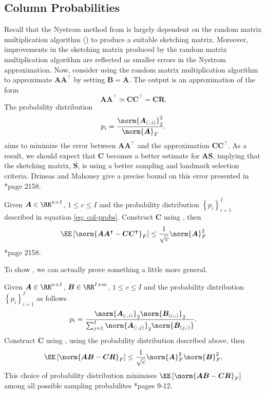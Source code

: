 \subsection{Column Probabilities}\label{Section2.2}

Recall that the Nystrom method from  is largely dependent on the random matrix multiplication algorithm () to produce a suitable sketching matrix. Moreover, improvements in the sketching matrix produced by the random matrix multiplication algorithm are reflected as smaller errors in the Nystrom approximation. Now, consider using the random matrix multiplication algorithm to approximate $\bm{A} \bm{A}^{\intercal}$ by setting $\bm{B} = \bm{A}$. The output is an approximation of the form
\begin{equation*}
    \bm{A} \bm{A}^{\intercal} \simeq \bm{C} \bm{C}^{\intercal} = \bm{C} \bm{R}.
\end{equation*}
The probability distribution
\begin{equation*} \label{eq: col-probs}
    p_i = \frac{\norm{\bm{A}_{(:,i)}}_2^2}{\norm{\bm{A}}_F}.
\end{equation*}
aims to minimize the error between $\bm{A} \bm{A}^{\intercal}$ and the approximation $\bm{C} \bm{C}^{\intercal}$. As a result, we should expect that $\bm{C}$ becomes a better estimate for $\bm{A} \bm{S}$, implying that the sketching matrix, $\bm{S}$, is using a better sampling and landmark selection criteria. Drineas and Mahoney give a precise bound on this error presented in  \cite{JMLR:v6:drineas05a}*{page 2158}.

\begin{thm} \label{thm: col-pro-bounds}
    Given $\bm{A} \in \RR^{n \times I}$, $1 \leq c \leq I$ and the probability distribution $\left\{ p_i \right\}_{i=1}^{I}$ described in equation \ref{eq: col-probs}. Construct $\bm{C}$ using , then
    \[
        \EE \left[ \norm{\bm{A} \bm{A}^{\intercal} - \bm{C} \bm{C}^{\intercal}}_{F} \right] \leq \frac{1}{\sqrt{c}} \norm{\bm{A}}^2_{F}
    \]
    \cite{JMLR:v6:drineas05a}*{page 2158}.
\end{thm}

To show , we can actually prove something a little more general.

\begin{lem} \label{lem: col-pro-bounds-gen}
    Given $\bm{A} \in \RR^{n \times I}$, $\bm{B} \in \RR^{I \times m}$, $1 \leq c \leq I$ and the probability distribution $\left\{ p_i \right\}_{i=1}^{I}$ as follows
    \[
        p_i = \frac{\norm{\bm{A}_{(:,i)}}_2 \norm{\bm{B}_{(i,:)}}_2}{\sum_{j=1}^{I} \norm{\bm{A}_{(:,j)}}_2 \norm{\bm{B}_{(j,:)}}}.
    \]
    Construct $\bm{C}$ using , using the probability distribution described above, then
    \[
        \EE \left[ \norm{\bm{A} \bm{B} - \bm{C} \bm{R}}_{F} \right] \leq \frac{1}{\sqrt{c}} \norm{\bm{A}}^2_{F} \norm{\bm{B}}^2_{F}.
    \]
    This choice of probability distribution minimises $\EE \left[ \norm{\bm{A} \bm{B} - \bm{C} \bm{R}}_{F} \right]$ among all possible sampling probabilites \cite{doi:10.1137/S0097539704442684}*{pages 9-12}.
\end{lem}

